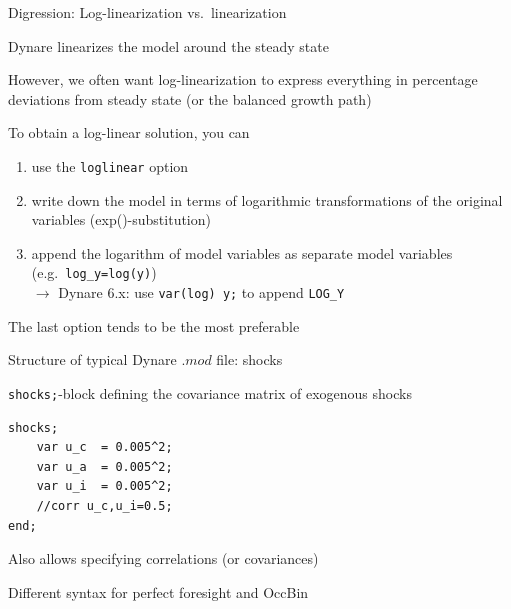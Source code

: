 \documentclass[handout,usepdftitle=false,xcolor=dvipsnames,aspectratio=169]{beamer}
\begin{document}
\begin{frame}{Digression: Log-linearization vs.\ linearization}
\begin{witemize}
\item Dynare linearizes the model around the steady state\vspace{0.2cm}
\item However, we often want log-linearization to express everything in percentage deviations from steady state (or the balanced growth path)\vspace{0.2cm}
\item To obtain a log-linear solution, you can\vspace{0.2cm}
\begin{enumerate}
\item use the \texttt{loglinear} option\vspace{0.2cm}
\item write down the model in terms of logarithmic transformations of the original variables (exp()-substitution)\vspace{0.2cm}
\item append the logarithm of model variables as separate model variables (e.g.\ \texttt{log\_y=log(y)})\\

$\rightarrow$ Dynare 6.x: use \texttt{var(log) y;} to append \texttt{LOG\_Y}
\end{enumerate}
\item The last option tends to be the most preferable
\end{witemize}
\end{frame}

\begin{frame}[fragile]{Structure of typical Dynare $.mod$ file: shocks}
\begin{witemize}
	\item \texttt{shocks;}-block defining the covariance matrix of exogenous shocks
\begin{verbatim}
shocks;
    var u_c  = 0.005^2;
    var u_a  = 0.005^2;
    var u_i  = 0.005^2;
    //corr u_c,u_i=0.5;
end;
\end{verbatim}
\item Also allows specifying correlations (or covariances)
\item Different syntax for perfect foresight and OccBin
\end{witemize}
\end{frame}
\end{document}
